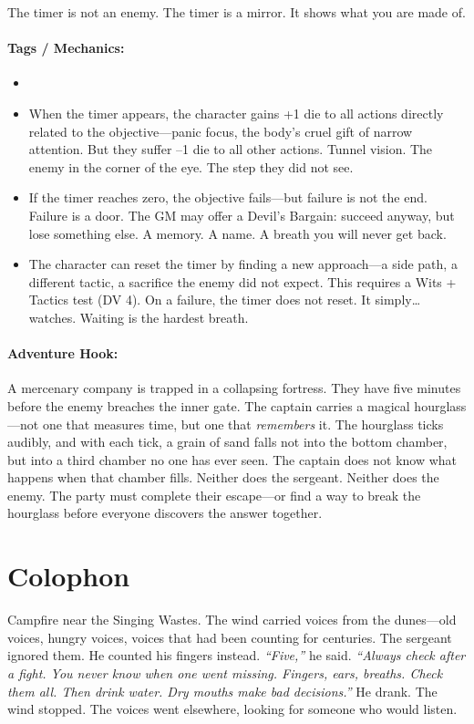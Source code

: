 The timer is not an enemy. The timer is a mirror. It shows what you are made of.

\paragraph{Tags / Mechanics:}
\begin{itemize}
\item [PRESSURE] [DREAD] [TRUTH]
\item When the timer appears, the character gains +1 die to all actions directly related to the objective---panic focus, the body's cruel gift of narrow attention. But they suffer --1 die to all other actions. Tunnel vision. The enemy in the corner of the eye. The step they did not see.
\item If the timer reaches zero, the objective fails---but failure is not the end. Failure is a door. The GM may offer a Devil's Bargain: succeed anyway, but lose something else. A memory. A name. A breath you will never get back.
\item The character can reset the timer by finding a new approach---a side path, a different tactic, a sacrifice the enemy did not expect. This requires a Wits + Tactics test (DV 4). On a failure, the timer does not reset. It simply\dots watches. Waiting is the hardest breath.
\end{itemize}

\paragraph{Adventure Hook:}
A mercenary company is trapped in a collapsing fortress. They have five minutes before the enemy breaches the inner gate. The captain carries a magical hourglass---not one that measures time, but one that \textit{remembers} it. The hourglass ticks audibly, and with each tick, a grain of sand falls not into the bottom chamber, but into a third chamber no one has ever seen. The captain does not know what happens when that chamber fills. Neither does the sergeant. Neither does the enemy. The party must complete their escape---or find a way to break the hourglass before everyone discovers the answer together.

\section*{Colophon}
Campfire near the Singing Wastes. The wind carried voices from the dunes---old voices, hungry voices, voices that had been counting for centuries. The sergeant ignored them. He counted his fingers instead. \textit{``Five,''} he said. \textit{``Always check after a fight. You never know when one went missing. Fingers, ears, breaths. Check them all. Then drink water. Dry mouths make bad decisions.''} He drank. The wind stopped. The voices went elsewhere, looking for someone who would listen.